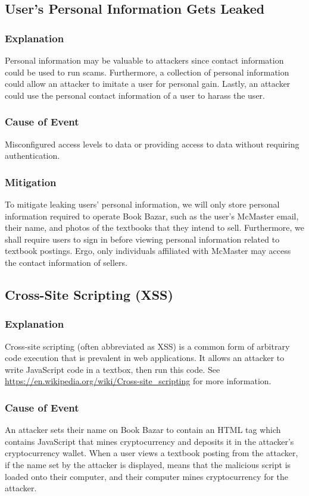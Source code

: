 \documentclass[fullpage]{article}
\begin{document}
\subsection{User's Personal Information Gets Leaked}

\subsubsection*{Explanation}
Personal information may be valuable to attackers since contact information could be used to run scams. Furthermore, a collection of personal information could allow an attacker to imitate a user for personal gain. Lastly, an attacker could use the personal contact information of a user to harass the user.
\subsubsection*{Cause of Event}
Misconfigured access levels to data or providing access to data without requiring authentication.
\subsubsection*{Mitigation}
To mitigate leaking users’ personal information, we will only store personal information required to operate Book Bazar, such as the user’s McMaster email, their name, and photos of the textbooks that they intend to sell. Furthermore, we shall require users to sign in before viewing personal information related to textbook postings. Ergo, only individuals affiliated with McMaster may access the contact information of sellers.

\subsection{Cross-Site Scripting (XSS)}

\subsubsection*{Explanation}
Cross-site scripting (often abbreviated as XSS) is a common form of arbitrary code execution that is prevalent in web applications. It allows an attacker to write JavaScript code in a textbox, then run this code. See \url{https://en.wikipedia.org/wiki/Cross-site_scripting}  for more information.

\subsubsection*{Cause of Event}
An attacker sets their name on Book Bazar to contain an HTML tag which contains JavaScript that mines cryptocurrency and deposits it in the attacker’s cryptocurrency wallet. When a user views a textbook posting from the attacker, if the name set by the attacker is displayed, means that the malicious script is loaded onto their computer, and their computer mines cryptocurrency for the attacker.
\end{document}
